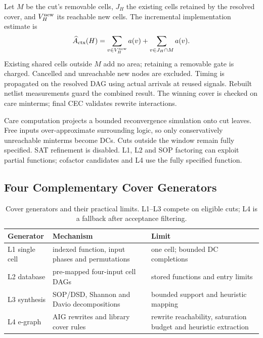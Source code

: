 Let $M$ be the cut's removable cells, $J_H$ the existing cells retained by the resolved cover, and $V_H^{\rm new}$ its reachable new cells. The incremental implementation estimate is
\begin{equation}
 \widehat A_{\rm ctx}(H)=\sum_{v\in V_H^{\rm new}}a(v)+\sum_{v\in J_H\cap M}a(v).\label{eq:context_area}
\end{equation}
Existing shared cells outside $M$ add no area; retaining a removable gate is charged. Cancelled and unreachable new nodes are excluded. Timing is propagated on the resolved DAG using actual arrivals at reused signals. Rebuilt netlist measurements guard the combined result. The winning cover is checked on care minterms; final CEC validates rewrite interactions.

Care computation projects a bounded reconvergence simulation onto cut leaves. Free inputs over-approximate surrounding logic, so only conservatively unreachable minterms become DCs. Cuts outside the window remain fully specified. SAT refinement is disabled. L1, L2 and SOP factoring can exploit partial functions; cofactor candidates and L4 use the fully specified function.

\subsection{Four Complementary Cover Generators}
\begin{table}[t]
  \centering\footnotesize
  \caption{Cover generators and their practical limits. L1--L3 compete on eligible cuts; L4 is a fallback after acceptance filtering.}\label{tab:layers}
  \tabcolsep=3pt
  \begin{tabular}{@{}l >{\raggedright\arraybackslash}p{3.05cm} >{\raggedright\arraybackslash}p{3.05cm}@{}}
    \toprule
    Generator & Mechanism & Limit \\
    \midrule
    L1 single cell & indexed function, input phases and permutations & one cell; bounded DC completions \\
    L2 database & pre-mapped four-input cell DAGs & stored functions and entry limits \\
    L3 synthesis & SOP/DSD, Shannon and Davio decompositions & bounded support and heuristic mapping \\
    L4 e-graph & AIG rewrites and library cover rules & rewrite reachability, saturation budget and heuristic extraction \\
    \bottomrule
  \end{tabular}
\end{table}

